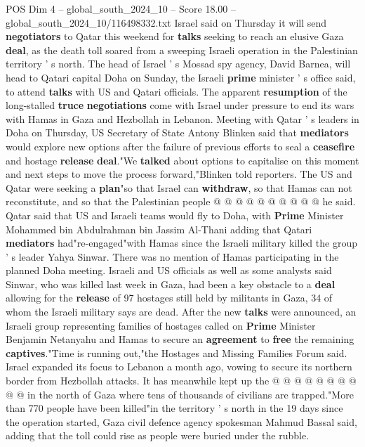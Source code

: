 \begin{textsample}{POS Dim 4 – global\_south\_2024\_10 – Score 18.00 – global\_south\_2024\_10/116498332.txt}  \label{ex:f4_pos_385}
Israel said on Thursday it will send \textbf{negotiators} to Qatar this weekend for \textbf{talks} seeking to reach an elusive Gaza \textbf{deal}, as the death toll soared from a sweeping Israeli operation in the Palestinian territory ' s north.
The head of Israel ' s Mossad spy agency, David Barnea, will head to Qatari capital Doha on Sunday, the Israeli \textbf{prime} minister ' s office said, to attend \textbf{talks} with US and Qatari officials.
The apparent \textbf{resumption} of the long-stalled \textbf{truce} \textbf{negotiations} come with Israel under pressure to end its wars with Hamas in Gaza and Hezbollah in Lebanon.
Meeting with Qatar ' s leaders in Doha on Thursday, US Secretary of State Antony Blinken said that \textbf{mediators} would explore new options after the failure of previous efforts to seal a \textbf{ceasefire} and hostage \textbf{release} \textbf{deal}."We \textbf{talked} about options to capitalise on this moment and next steps to move the process forward,"Blinken told reporters.
The US and Qatar were seeking a \textbf{plan}"so that Israel can \textbf{withdraw}, so that Hamas can not reconstitute, and so that the Palestinian people @ @ @ @ @ @ @ @ @ @ he said.
Qatar said that US and Israeli teams would fly to Doha, with \textbf{Prime} Minister Mohammed bin Abdulrahman bin Jassim Al-Thani adding that Qatari \textbf{mediators} had"re-engaged"with Hamas since the Israeli military killed the group ' s leader Yahya Sinwar.
There was no mention of Hamas participating in the planned Doha meeting.
Israeli and US officials as well as some analysts said Sinwar, who was killed last week in Gaza, had been a key obstacle to a \textbf{deal} allowing for the \textbf{release} of 97 hostages still held by militants in Gaza, 34 of whom the Israeli military says are dead.
After the new \textbf{talks} were announced, an Israeli group representing families of hostages called on \textbf{Prime} Minister Benjamin Netanyahu and Hamas to secure an \textbf{agreement} to \textbf{free} the remaining \textbf{captives}."Time is running out,"the Hostages and Missing Families Forum said.
Israel expanded its focus to Lebanon a month ago, vowing to secure its northern border from Hezbollah attacks.
It has meanwhile kept up the @ @ @ @ @ @ @ @ @ @ in the north of Gaza where tens of thousands of civilians are trapped."More than 770 people have been killed"in the territory ' s north in the 19 days since the operation started, Gaza civil defence agency spokesman Mahmud Bassal said, adding that the toll could rise as people were buried under the rubble.

\end{textsample}
